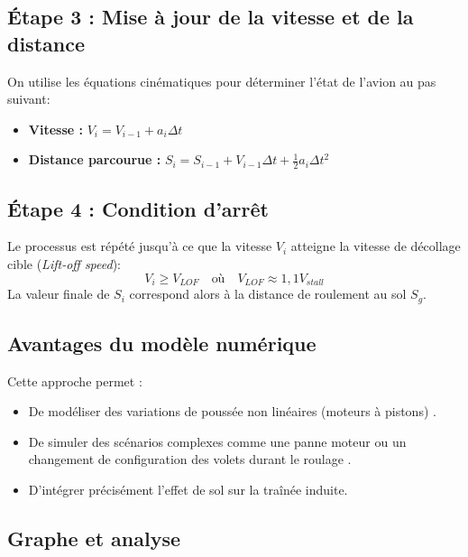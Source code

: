 		\subsection*{Étape 3 : Mise à jour de la vitesse et de la distance}
		On utilise les équations cinématiques pour déterminer l'état de l'avion au pas suivant:
		\begin{itemize}
			\item \textbf{Vitesse :} $V_i = V_{i-1} + a_i \Delta t$ 
			\item \textbf{Distance parcourue :} $S_i = S_{i-1} + V_{i-1} \Delta t + \frac{1}{2} a_i \Delta t^2$
		\end{itemize}
		
		\subsection*{Étape 4 : Condition d'arrêt}
		Le processus est répété jusqu'à ce que la vitesse $V_i$ atteigne la vitesse de décollage cible (\textit{Lift-off speed}):
		\[ V_i \geq V_{LOF} \quad \text{où} \quad V_{LOF} \approx 1{,}1 V_{stall} \]
		La valeur finale de $S_i$ correspond alors à la distance de roulement au sol $S_g$.
		
		\subsection{Avantages du modèle numérique}
			Cette approche permet :
			\begin{itemize}
				\item De modéliser des variations de poussée non linéaires (moteurs à pistons) .
				\item De simuler des scénarios complexes comme une panne moteur ou un changement de configuration des volets durant le roulage .
				\item D'intégrer précisément l'effet de sol sur la traînée induite.
			\end{itemize}
		
				\vspace*{1cm}
		
		\subsection{Graphe et analyse}
				
